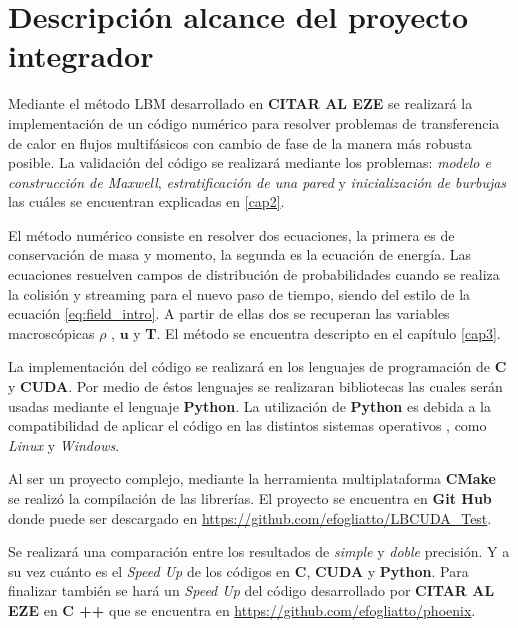 \section{Descripción alcance del proyecto integrador}

Mediante el método LBM desarrollado en \textbf{CITAR AL EZE}	se realizará la implementación de un código numérico para resolver problemas de transferencia de calor en flujos multifásicos con cambio de fase de la manera más robusta posible.
La validación del código se realizará mediante los problemas: \textit{modelo e construcción de Maxwell}, \textit{estratificación de una pared} y \textit{inicialización de burbujas} las cuáles se encuentran explicadas en \ref{cap2}.

El método numérico consiste en resolver dos ecuaciones, la primera es de conservación de masa y momento, la segunda es la ecuación de energía. Las ecuaciones resuelven campos de distribución de probabilidades cuando se realiza la colisión y streaming para el nuevo paso de tiempo, siendo del estilo de la ecuación \ref{eq:field_intro}. A partir de ellas dos se recuperan las variables macroscópicas $\rho$ , $\mathbf{u}$ y \textbf{T}. El método se encuentra descripto en el capítulo \ref{cap3}.

La implementación del código se realizará en los lenguajes de programación de \textbf{C} y \textbf{CUDA}. Por medio de éstos lenguajes se realizaran bibliotecas las cuales serán usadas mediante el lenguaje \textbf{Python}. La utilización de \textbf{Python} es debida a la compatibilidad de aplicar  el código en las distintos sistemas operativos , como \textit{Linux} y \textit{Windows}.

Al ser un proyecto complejo, mediante la herramienta multiplataforma \textbf{CMake} se realizó la compilación de las librerías. El proyecto se encuentra en \textbf{Git Hub} donde puede ser descargado en \url{ https://github.com/efogliatto/LBCUDA_Test}.

Se realizará una comparación entre los resultados de \textit{simple} y \textit{doble} precisión. Y a su vez cuánto es el \textit{Speed Up} de los códigos en \textbf{C}, \textbf{CUDA} y \textbf{Python}. Para finalizar también  se hará un \textit{Speed Up} del código desarrollado por \textbf{CITAR AL EZE} en \textbf{C ++} que se encuentra en \url{https://github.com/efogliatto/phoenix}.



